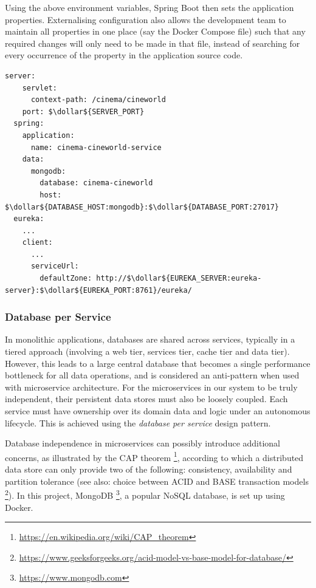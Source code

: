 Using the above environment variables, Spring Boot then sets the application properties. Externalising configuration also allows the development team to maintain all properties in one place (say the Docker Compose file) such that any required changes will only need to be made in that file, instead of searching for every occurrence of the property in the application source code.

\begin{lstlisting}[caption=Snippet from \code{cinema-cineworld-service} \code{application.yml} file]
  server:
    servlet:
      context-path: /cinema/cineworld
    port: $\dollar${SERVER_PORT}
  spring:
    application:
      name: cinema-cineworld-service
    data:
      mongodb:
        database: cinema-cineworld
        host: $\dollar${DATABASE_HOST:mongodb}:$\dollar${DATABASE_PORT:27017}
  eureka:
    ...
    client:
      ...
      serviceUrl:
        defaultZone: http://$\dollar${EUREKA_SERVER:eureka-server}:$\dollar${EUREKA_PORT:8761}/eureka/
\end{lstlisting}

\subsubsection{Database per Service}

In monolithic applications, databases are shared across services, typically in a tiered approach (involving a web tier, services tier, cache tier and data tier). However, this leads to a large central database that becomes a single performance bottleneck for all data operations, and is considered an anti-pattern when used with microservice architecture. For the microservices in our system to be truly independent, their persistent data stores must also be loosely coupled. Each service must have ownership over its domain data and logic under an autonomous lifecycle. This is achieved using the \textit{database per service} design pattern.

Database independence in microservices can possibly introduce additional concerns, as illustrated by the CAP theorem \footnote{\url{https://en.wikipedia.org/wiki/CAP_theorem}}, according to which a distributed data store can only provide two of the following: consistency, availability and partition tolerance (see also: choice between ACID and BASE transaction models \footnote{\url{https://www.geeksforgeeks.org/acid-model-vs-base-model-for-database/}}). In this project, MongoDB \footnote{\url{https://www.mongodb.com}}, a popular NoSQL database, is set up using Docker.

